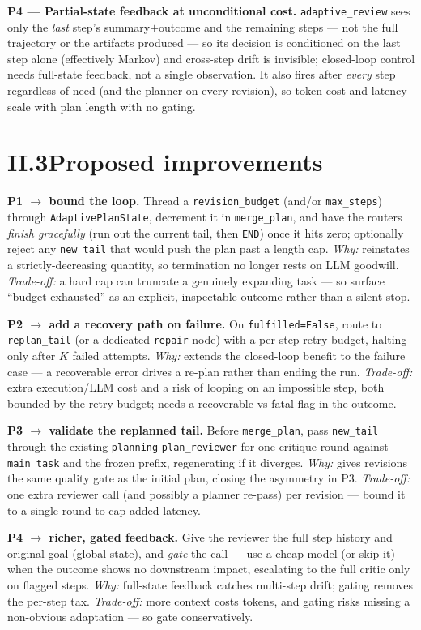 \documentclass[11pt]{article}
\newcommand{\code}[1]{\texttt{#1}}
\begin{document}
\textbf{P4 --- Partial-state feedback at unconditional cost.} \code{adaptive\_review} sees only the \emph{last} step's summary$+$outcome and
the remaining steps --- not the full trajectory or the artifacts produced --- so its decision is conditioned on the last step alone (effectively Markov)
and cross-step drift is invisible; closed-loop control needs full-state feedback, not a single observation. It also fires after
\emph{every} step regardless of need (and the planner on every revision), so token cost and latency scale with plan length with no
gating.

\section*{II.3\quad Proposed improvements}

\textbf{P1 $\to$ bound the loop.} Thread a \code{revision\_budget} (and/or \code{max\_steps}) through \code{AdaptivePlanState},
decrement it in \code{merge\_plan}, and have the routers \emph{finish gracefully} (run out the current tail, then \code{END}) once it
hits zero; optionally reject any \code{new\_tail} that would push the plan past a length cap. \emph{Why:} reinstates a
strictly-decreasing quantity, so termination no longer rests on LLM goodwill. \emph{Trade-off:} a hard cap can truncate a genuinely
expanding task --- so surface ``budget exhausted'' as an explicit, inspectable outcome rather than a silent stop.

\textbf{P2 $\to$ add a recovery path on failure.} On \code{fulfilled=False}, route to \code{replan\_tail} (or a dedicated
\code{repair} node) with a per-step retry budget, halting only after $K$ failed attempts. \emph{Why:} extends the closed-loop
benefit to the failure case --- a recoverable error drives a re-plan rather than ending the run.
\emph{Trade-off:} extra execution/LLM cost and a risk of looping on an impossible step, both bounded by the retry budget; needs a
recoverable-vs-fatal flag in the outcome.

\textbf{P3 $\to$ validate the replanned tail.} Before \code{merge\_plan}, pass \code{new\_tail} through the existing \code{planning}
\code{plan\_reviewer} for one critique round against \code{main\_task} and the frozen prefix, regenerating if it diverges.
\emph{Why:} gives revisions the same quality gate as the initial plan, closing the asymmetry in P3. \emph{Trade-off:} one extra
reviewer call (and possibly a planner re-pass) per revision --- bound it to a single round to cap added latency.

\textbf{P4 $\to$ richer, gated feedback.} Give the reviewer the full step history and original goal (global state), and \emph{gate}
the call --- use a cheap model (or skip it) when the outcome shows no downstream impact, escalating to the full critic only on
flagged steps. \emph{Why:} full-state feedback catches multi-step drift; gating removes the per-step tax. \emph{Trade-off:} more
context costs tokens, and gating risks missing a non-obvious adaptation --- so gate conservatively.
\end{document}
